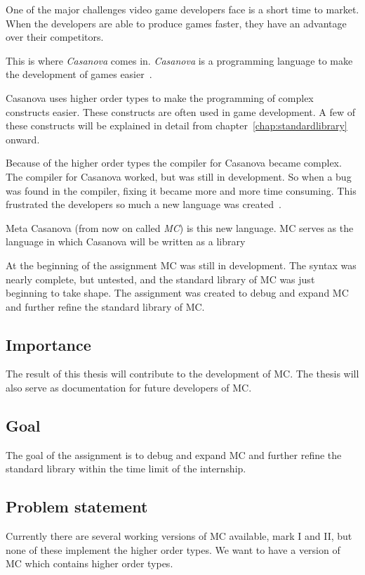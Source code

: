 One of the major challenges video game developers face is a short time to market.
When the developers are able to produce games faster, they have an advantage over their competitors.

This is where \emph{Casanova} comes in.
\emph{Casanova} is a programming language to make the development of games easier~\cite{maggiore2011designing}.

Casanova uses higher order types to make the programming of complex constructs easier.
These constructs are often used in game development.
A few of these constructs will be explained in detail from chapter~\ref{chap:standardlibrary} onward.

Because of the higher order types the compiler for Casanova became complex.
The compiler for Casanova worked, but was still in development.
So when a bug was found in the compiler, fixing it became more and more time consuming.
This frustrated the developers so much a new language was created~\cite{giuseppe2015mc}.

Meta Casanova (from now on called \emph{MC}) is this new language.
MC serves as the language in which Casanova will be written as a library

At the beginning of the assignment MC was still in development.
The syntax was nearly complete, but untested, and the standard library of MC was just beginning to take shape.
The assignment was created to debug and expand MC and further refine the standard library of MC.


\subsection{Importance}
The result of this thesis will contribute to the development of MC.
The thesis will also serve as documentation for future developers of MC.

\subsection{Goal}\label{sec:goalsmandate}
The goal of the assignment is to debug and expand MC and further refine the standard library within the time limit of the internship.

\subsection{Problem statement}
Currently there are several working versions of MC available, mark I and II, but none of these implement the higher order types.
We want to have a version of MC which contains higher order types.

